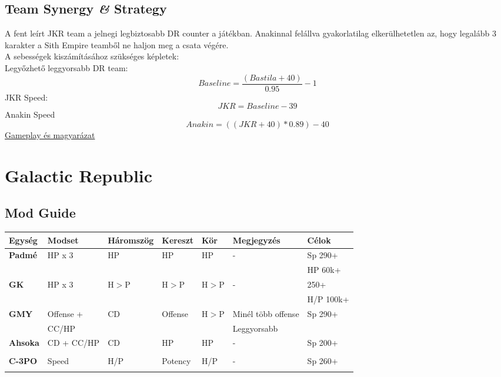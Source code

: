 \documentclass[11pt]{report}
\begin{document}
\section{Team Synergy \textit{\&} Strategy}
A fent leírt JKR team a jelnegi legbiztosabb DR counter a játékban. Anakinnal felállva gyakorlatilag elkerülhetetlen az, hogy legalább 3 karakter a Sith Empire teamből ne haljon meg a csata végére.\\
A sebességek kiszámításához szükséges képletek:\\
Legyőzhető leggyorsabb DR team:
\begin{equation}
    Baseline=\frac{(Bastila+40)}{0.95}-1
\end{equation}
JKR Speed:
\begin{equation}
    JKR=Baseline-39
\end{equation}
Anakin Speed
\begin{equation}
    Anakin=((JKR+40)*0.89)-40
\end{equation}
\href{https://youtu.be/IH_Xo9CuSho}{Gameplay és magyarázat}


\chapter{Galactic Republic}
\section{Mod Guide}
\begin{center}
    \begin{tabular}{|l | l | l | l | l | l | l |}
        \hline
        Egység & Modset & Háromszög & Kereszt & Kör & Megjegyzés & Célok\\ \hline
        \textbf{Padmé} & HP x 3 & HP & HP & HP & - & Sp 290+\\ 
        &  &  &  &  &  & HP 60k+\\ \hline
        \textbf{GK} & HP x 3 & H$>$P & H$>$P & H$>$P & - & 250+\\
        &  &  &  &  &  & H/P 100k+\\ \hline        
        \textbf{GMY} & Offense + & CD & Offense & H$>$P & Minél több offense & Sp 290+\\
        & CC/HP &  &  &  & Leggyorsabb & \\ \hline
        \textbf{Ahsoka} & CD + CC/HP & CD & HP & HP & - & Sp 200+\\
        &  &  &  &  &  & \\ \hline
        \textbf{C-3PO} & Speed & H/P & Potency & H/P & - & Sp 260+\\
        &  &  &  &  &  & \\ \hline        
    \end{tabular}
\end{center}
\end{document}
